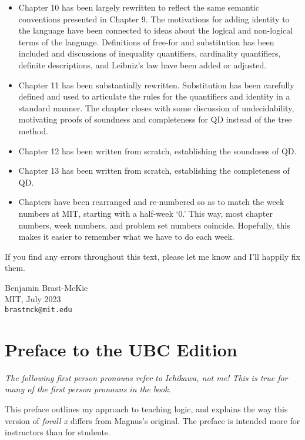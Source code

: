 \begin{itemize}
  \item Chapter 10 has been largely rewritten to reflect the same semantic conventions presented in Chapter 9. The motivations for adding identity to the language have been connected to ideas about the logical and non-logical terms of the language. Definitions of free-for and substitution has been included and discussions of inequality quantifiers, cardinality quantifiers, definite descriptions, and Leibniz's law have been added or adjusted.
  \item Chapter 11 has been substantially rewritten. Substitution has been carefully defined and used to articulate the rules for the quantifiers and identity in a standard manner. The chapter closes with some discussion of undecidability, motivating proofs of soundness and completeness for QD instead of the tree method.
  \item Chapter 12 has been written from scratch, establishing the soundness of QD.
  \item Chapter 13 has been written from scratch, establishing the completeness of QD.
  \item Chapters have been rearranged and re-numbered so as to match the week numbers at MIT, starting with a half-week `0.'
    This way, most chapter numbers, week numbers, and problem set numbers coincide.
    Hopefully, this makes it easier to remember what we have to do each week.
\end{itemize}

If you find any errors throughout this text, please let me know and I'll happily fix them.

\begin{flushright}
\textsf{Benjamin Brast-McKie} \\
\textsf{MIT, July 2023} \\
\texttt{brastmck@mit.edu}
\end{flushright}


\iffalse

\chapter*{Preface to the UBC Edition}
\label{ch.preface}

\textit{The following first person pronouns refer to Ichikawa, not me! This is true for many of the first person pronouns in the book.}

This preface outlines my approach to teaching logic, and explains the way this version of \emph{forall x} differs from Magnus's original. The preface is intended more for instructors than for students. 

